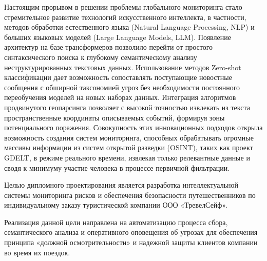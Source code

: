 Настоящим прорывом в решении проблемы глобального мониторинга стало стремительное развитие технологий искусственного интеллекта, в частности, методов обработки естественного языка (Natural Language Processing, NLP) и больших языковых моделей (Large Language Models, LLM). Появление архитектур на базе трансформеров позволило перейти от простого синтаксического поиска к глубокому семантическому анализу неструктурированных текстовых данных. Использование методов Zero-shot классификации дает возможность сопоставлять поступающие новостные сообщения с обширной таксономией угроз без необходимости постоянного переобучения моделей на новых наборах данных. Интеграция алгоритмов продвинутого геопарсинга позволяет с высокой точностью извлекать из текста пространственные координаты описываемых событий, формируя зоны потенциального поражения. Совокупность этих инновационных подходов открыла возможность создания систем мониторинга, способных обрабатывать огромные массивы информации из систем открытой разведки (OSINT), таких как проект GDELT, в режиме реального времени, извлекая только релевантные данные и сводя к минимуму участие человека в процессе первичной фильтрации.

Целью дипломного проектирования является разработка интеллектуальной системы мониторинга рисков и обеспечения безопасности путешественников по индивидуальному заказу туристической компании ООО «ТревелСейф».

Реализация данной цели направлена на автоматизацию процесса сбора, семантического анализа и оперативного оповещения об угрозах для обеспечения принципа «должной осмотрительности» и надежной защиты клиентов компании во время их поездок.

